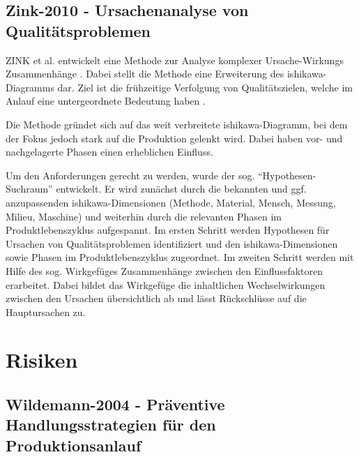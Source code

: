 \subsection*{Zink-2010 - Ursachenanalyse von Qualitätsproblemen}

ZINK et al. entwickelt eine Methode zur Analyse komplexer Ursache-Wirkungs Zusammenhänge \cite{Zink2010}. Dabei stellt die Methode eine Erweiterung des \gls{ishikawa}-Diagramms dar. Ziel ist die frühzeitige Verfolgung von Qualitätszielen, welche im Anlauf eine untergeordnete Bedeutung haben \cite{Fleischer2003, Terwiesch2001a}. 

Die Methode gründet sich auf das weit verbreitete \gls{ishikawa}-Diagramm, bei dem der Fokus jedoch stark auf die Produktion gelenkt wird. Dabei haben vor- und nachgelagerte Phasen einen erheblichen Einfluss. 

Um den Anforderungen gerecht zu werden, wurde der sog. ``Hypothesen-Suchraum'' entwickelt. Er wird zunächst durch die bekannten und ggf. anzupassenden \gls{ishikawa}-Dimensionen (Methode, Material, Mensch, Messung, Milieu, Maschine) und weiterhin durch die relevanten Phasen im Produktlebenszyklus aufgespannt. 
Im ersten Schritt werden Hypothesen für Ursachen von Qualitätsproblemen identifiziert und den \gls{ishikawa}-Dimensionen sowie Phasen im Produktlebenszyklus zugeordnet. 
Im zweiten Schritt werden mit Hilfe des sog. Wirkgefüges Zusammenhänge zwischen den Einflussfaktoren erarbeitet. Dabei bildet das Wirkgefüge die inhaltlichen Wechselwirkungen zwischen den Ursachen übersichtlich ab und lässt Rückschlüsse auf die Hauptursachen zu. 

\section{Risiken}

\subsection*{Wildemann-2004 - Präventive Handlungsstrategien für den Produktionsanlauf}

